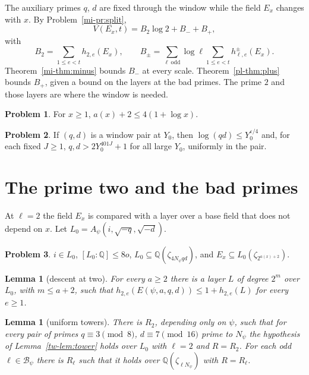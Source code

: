 \documentclass[reqno]{amsart}
\theoremstyle{definition}
\newtheorem{problem}{Problem}[section]
\theoremstyle{plain}
\newtheorem{lemma}[theorem]{Lemma}
\theoremstyle{remark}
\newcommand{\Q}{\mathbb{Q}}
\newcommand{\Bc}{\mathcal{B}}
\begin{document}
The auxiliary primes \(q\), \(d\) are fixed through the window while the field \(E_x\) changes with \(x\).  By Problem~\ref{mi-pr:split},
\[
 V(E_x,t)=B_2\log2+B_-+B_+,
\]
with
\[
 B_2=\sum_{1\le e<t}h_{2,e}(E_x),\qquad B_\pm=\sum_{\ell\ \mathrm{odd}}\log\ell\sum_{1\le e<t}h^\pm_{\ell,e}(E_x).
\]
Theorem~\ref{mi-thm:minus} bounds \(B_-\) at every scale.  Theorem~\ref{pl-thm:plus} bounds \(B_+\), given a bound on the layers at the bad primes.  The prime \(2\) and those layers are where the window is needed.

\begin{problem}\label{pr:page}
For \(x\ge1\), \(a(x)+2\le4(1+\log x)\).
\end{problem}

\begin{problem}\label{pr:log-qd}
If \((q,d)\) is a window pair at \(Y_0\), then \(\log(qd)\le Y_0^{\varepsilon/4}\) and, for each fixed \(J\ge1\), \(q,d>2Y_0^{401J}+1\) for all large \(Y_0\), uniformly in the pair.
\end{problem}

\section{The prime two and the bad primes}\label{sec:two}

At \(\ell=2\) the field \(E_x\) is compared with a layer over a base field that does not depend on \(x\).  Let \(L_0=A_\psi(i,\sqrt{-q},\sqrt{-d})\).

\begin{problem}\label{pr:L0}
\(i\in L_0\), \([L_0:\Q]\le8o\), \(L_0\subseteq\Q(\zeta_{4N_\psi qd})\), and \(E_x\subseteq L_0(\zeta_{2^{a(x)+2}})\).
\end{problem}

\begin{lemma}[descent at two]\label{lem:two}
For every \(a\ge2\) there is a layer \(L\) of degree \(2^m\) over \(L_0\), with \(m\le a+2\), such that \(h_{2,e}(E(\psi,a,q,d))\le1+h_{2,e}(L)\) for every \(e\ge1\).
\end{lemma}

\begin{lemma}[uniform towers]\label{lem:uniform}
There is \(R_2\), depending only on \(\psi\), such that for every pair of primes \(q\equiv3\pmod8\), \(d\equiv7\pmod{16}\) prime to \(N_\psi\) the hypothesis of Lemma~\ref{tw-lem:tower} holds over \(L_0\) with \(\ell=2\) and \(R=R_2\).  For each odd \(\ell\in\Bc_\psi\) there is \(R_\ell\) such that it holds over \(\Q(\zeta_{\ell N_\psi})\) with \(R=R_\ell\).
\end{lemma}
\end{document}
